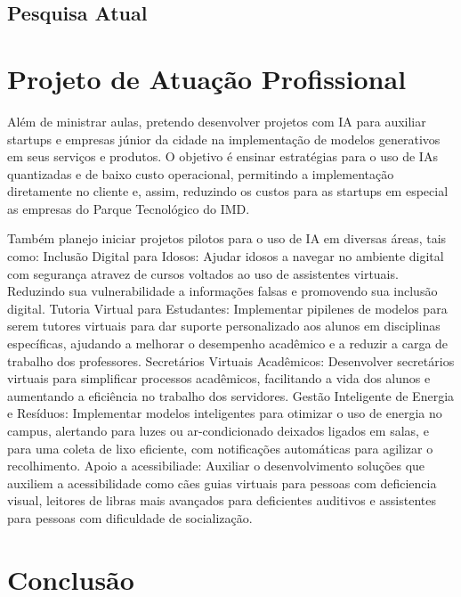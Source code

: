 \documentclass[10pt,a4paper,oneside]{book}
\begin{document}
\section{Pesquisa Atual}

\chapter{Projeto de Atuação Profissional}
\label{cap_proje}

Além de ministrar aulas, pretendo desenvolver projetos com IA para auxiliar startups e empresas júnior da cidade na
implementação de modelos generativos em seus serviços e produtos. O objetivo é ensinar estratégias para o uso de IAs
quantizadas e de baixo custo operacional, permitindo a implementação diretamente no cliente e, assim, reduzindo os
custos para as startups em especial as empresas do Parque Tecnológico do IMD.

Também planejo iniciar projetos pilotos para o uso de IA em diversas áreas, tais como:
Inclusão Digital para Idosos: Ajudar idosos a navegar no ambiente digital com segurança atravez de cursos voltados ao uso de assistentes virtuais. Reduzindo sua vulnerabilidade a informações falsas e promovendo sua inclusão digital.
Tutoria Virtual para Estudantes: Implementar pipilenes de modelos para serem tutores virtuais para dar suporte personalizado aos alunos em disciplinas específicas, ajudando a melhorar o desempenho acadêmico e a reduzir a carga de trabalho dos professores.
Secretários Virtuais Acadêmicos: Desenvolver secretários virtuais para simplificar processos acadêmicos, facilitando a vida dos alunos e aumentando a eficiência no trabalho dos servidores.
Gestão Inteligente de Energia e Resíduos: Implementar modelos inteligentes para otimizar o uso de energia no campus, alertando para luzes ou ar-condicionado deixados ligados em salas, e para uma coleta de lixo eficiente, com notificações automáticas para agilizar o recolhimento.
Apoio a acessibiliade: Auxiliar  o desenvolvimento soluções que auxiliem a acessibilidade como cães guias virtuais para pessoas com deficiencia visual, leitores de libras mais avançados para deficientes auditivos e assistentes para pessoas com dificuldade de socialização.


\chapter{Conclusão}
\label{cap_conclusao}
\end{document}
